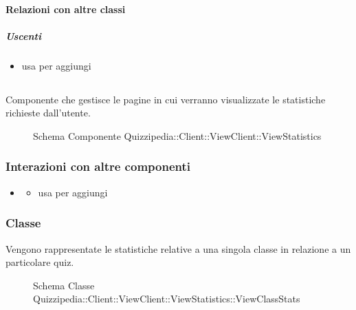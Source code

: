 \paragraph{Relazioni con altre classi}
\subparagraph{Uscenti}
\begin{itemize}
\item usa  per aggiungi
\end{itemize}
\subsection{}
Componente che gestisce le pagine in cui verranno visualizzate le statistiche richieste dall'utente.
\begin{figure}[H]
\centering
\noindent{}
\caption[Schema Componente Quizzipedia::Client::ViewClient::ViewStatistics]{Schema Componente Quizzipedia::Client::ViewClient::ViewStatistics}
\end{figure}
\subsubsection{Interazioni con altre componenti}
\begin{itemize}
\item {}
\begin{itemize}
\item usa  per aggiungi
\end{itemize}
\end{itemize}
\subsubsection{Classe }
Vengono rappresentate le statistiche relative a una singola classe in relazione a un particolare quiz.
\begin{figure}[H]
\centering
\noindent{}
\caption[Schema Classe ViewClassStats]{Schema Classe Quizzipedia::Client::ViewClient::ViewStatistics::ViewClassStats}
\end{figure}
